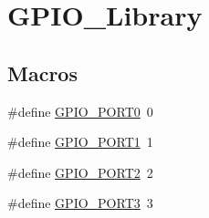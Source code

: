 \hypertarget{group__GPIO__Library}{}\section{G\+P\+I\+O\+\_\+\+Library}
\label{group__GPIO__Library}
\subsection*{Macros}
\begin{DoxyCompactItemize}
\item 
\#define \hyperlink{group__GPIO__Library_gad1230a811f6bc942c555ee29f8e94492}{G\+P\+I\+O\+\_\+\+P\+O\+R\+T0}~0
\item 
\#define \hyperlink{group__GPIO__Library_ga4135ea22c25d40b07b0a6efd9bd04afc}{G\+P\+I\+O\+\_\+\+P\+O\+R\+T1}~1
\item 
\#define \hyperlink{group__GPIO__Library_gafd8ac6f9c2840f934bd64c5d1afbee1b}{G\+P\+I\+O\+\_\+\+P\+O\+R\+T2}~2
\item 
\#define \hyperlink{group__GPIO__Library_ga3a80ea3e46215d518b8488713acc1d64}{G\+P\+I\+O\+\_\+\+P\+O\+R\+T3}~3
\end{DoxyCompactItemize}
